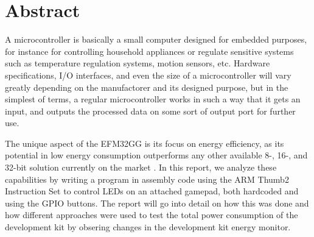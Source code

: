 \section{Abstract}

	A microcontroller is basically a small computer designed for embedded purposes, for instance for controlling household appliances or regulate sensitive systems such as temperature regulation systems, motion sensors, etc. Hardware specifications, I/O interfaces, and even the size of a microcontroller will vary greatly depending on the manufactorer and its designed purpose, but in the simplest of terms, a regular microcontroller works in such a way that it gets an input, and outputs the processed data on some sort of output port for further use.
	
	The unique aspect of the EFM32GG is its focus on energy efficiency, as its potential in low energy consumption outperforms any other available 8-, 16-, and 32-bit solution currently on the market \cite{EFM32GG-rm}. In this report, we analyze these capabilities by writing a program in assembly code using the ARM Thumb2 Instruction Set to control LEDs on an attached gamepad, both hardcoded and using the GPIO buttons. The report will go into detail on how this was done and how different approaches were used to test the total power consumption of the development kit by obsering changes in the development kit energy monitor.
	
	